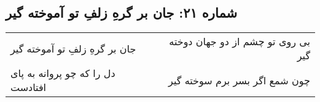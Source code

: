 \begin{center}
\section*{شماره ۲۱: جان بر گرهِ زلفِ تو آموخته گیر}
\label{sec:021}
\begin{longtable}{l p{0.5cm} r}
جان بر گرهِ زلفِ تو آموخته گیر
&&
بی روی تو چشم از دو جهان دوخته گیر
\\
دل را که چو پروانه به پای افتادست
&&
چون شمع اگر بسر برم سوخته گیر
\\
\end{longtable}
\end{center}
